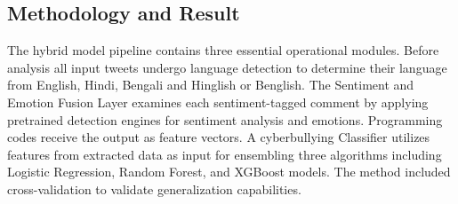 \documentclass[pdflatex,sn-mathphys-num]{sn-jnl}%
\theoremstyle{thmstyleone}%
\theoremstyle{thmstyletwo}%
\theoremstyle{thmstylethree}%
\begin{document}



\subsection{Methodology and Result}



The hybrid model pipeline contains three essential operational modules. Before analysis all input tweets undergo language detection to determine their language from English, Hindi, Bengali and Hinglish or Benglish. The Sentiment and Emotion Fusion Layer examines each sentiment-tagged comment by applying pretrained detection engines for sentiment analysis and emotions. Programming codes receive the output as feature vectors. A cyberbullying Classifier utilizes features from extracted data as input for ensembling three algorithms including Logistic Regression, Random Forest, and XGBoost models. The method included cross-validation to validate generalization capabilities.
\end{document}
